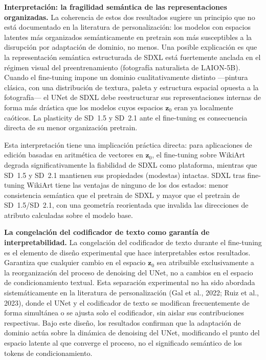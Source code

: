 \documentclass[12pt, a4paper, twoside]{book}
\newcommand{\z}{\mathbf{z}}
\begin{document}
\textbf{Interpretación: la fragilidad semántica de las representaciones organizadas.} La coherencia de estos dos resultados sugiere un principio que no está documentado en la literatura de personalización: los modelos con espacios latentes más organizados semánticamente en pretrain son más susceptibles a la disrupción por adaptación de dominio, no menos. Una posible explicación es que la representación semántica estructurada de SDXL está fuertemente anclada en el régimen visual del preentrenamiento (fotografía naturalista de LAION-5B). Cuando el fine-tuning impone un dominio cualitativamente distinto ---pintura clásica, con una distribución de textura, paleta y estructura espacial opuesta a la fotografía--- el UNet de SDXL debe reestructurar sus representaciones internas de forma más drástica que los modelos cuyos espacios $\z_0$ eran ya localmente caóticos. La plasticity de SD~1.5 y SD~2.1 ante el fine-tuning es consecuencia directa de su menor organización pretrain.

Esta interpretación tiene una implicación práctica directa: para aplicaciones de edición basadas en aritmética de vectores en $\z_0$, el fine-tuning sobre WikiArt degrada significativamente la fiabilidad de SDXL como plataforma, mientras que SD~1.5 y SD~2.1 mantienen sus propiedades (modestas) intactas. SDXL tras fine-tuning WikiArt tiene las ventajas de ninguno de los dos estados: menor consistencia semántica que el pretrain de SDXL y mayor que el pretrain de SD~1.5/SD~2.1, con una geometría reorientada que invalida las direcciones de atributo calculadas sobre el modelo base.

\textbf{La congelación del codificador de texto como garantía de interpretabilidad.} La congelación del codificador de texto durante el fine-tuning es el elemento de diseño experimental que hace interpretables estos resultados. Garantiza que cualquier cambio en el espacio $\z_0$ sea atribuible exclusivamente a la reorganización del proceso de denoising del UNet, no a cambios en el espacio de condicionamiento textual. Esta separación experimental no ha sido abordada sistemáticamente en la literatura de personalización (Gal et al., 2022; Ruiz et al., 2023), donde el UNet y el codificador de texto se modifican frecuentemente de forma simultánea o se ajusta solo el codificador, sin aislar sus contribuciones respectivas. Bajo este diseño, los resultados confirman que la adaptación de dominio actúa sobre la dinámica de denoising del UNet, modificando el punto del espacio latente al que converge el proceso, no el significado semántico de los tokens de condicionamiento.
\end{document}
